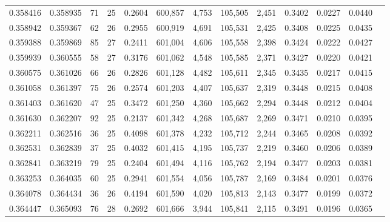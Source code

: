 \begin{tabular}{rrrrrrrrrrrrr}
0.358416 & 0.358935 &  71 &  25 &                                     0.2604 & 600,857 &   4,753 & 105,505 &   2,451 & 0.3402 & 0.0227 & 0.0440 \\
0.358942 & 0.359367 &  62 &  26 &                                     0.2955 & 600,919 &   4,691 & 105,531 &   2,425 & 0.3408 & 0.0225 & 0.0435 \\
0.359388 & 0.359869 &  85 &  27 &                                     0.2411 & 601,004 &   4,606 & 105,558 &   2,398 & 0.3424 & 0.0222 & 0.0427 \\
0.359939 & 0.360555 &  58 &  27 &                                     0.3176 & 601,062 &   4,548 & 105,585 &   2,371 & 0.3427 & 0.0220 & 0.0421 \\
0.360575 & 0.361026 &  66 &  26 &                                     0.2826 & 601,128 &   4,482 & 105,611 &   2,345 & 0.3435 & 0.0217 & 0.0415 \\
0.361058 & 0.361397 &  75 &  26 &                                     0.2574 & 601,203 &   4,407 & 105,637 &   2,319 & 0.3448 & 0.0215 & 0.0408 \\
0.361403 & 0.361620 &  47 &  25 &                                     0.3472 & 601,250 &   4,360 & 105,662 &   2,294 & 0.3448 & 0.0212 & 0.0404 \\
0.361630 & 0.362207 &  92 &  25 &                                     0.2137 & 601,342 &   4,268 & 105,687 &   2,269 & 0.3471 & 0.0210 & 0.0395 \\
0.362211 & 0.362516 &  36 &  25 &                                     0.4098 & 601,378 &   4,232 & 105,712 &   2,244 & 0.3465 & 0.0208 & 0.0392 \\
0.362531 & 0.362839 &  37 &  25 &                                     0.4032 & 601,415 &   4,195 & 105,737 &   2,219 & 0.3460 & 0.0206 & 0.0389 \\
0.362841 & 0.363219 &  79 &  25 &                                     0.2404 & 601,494 &   4,116 & 105,762 &   2,194 & 0.3477 & 0.0203 & 0.0381 \\
0.363253 & 0.364035 &  60 &  25 &                                     0.2941 & 601,554 &   4,056 & 105,787 &   2,169 & 0.3484 & 0.0201 & 0.0376 \\
0.364078 & 0.364434 &  36 &  26 &                                     0.4194 & 601,590 &   4,020 & 105,813 &   2,143 & 0.3477 & 0.0199 & 0.0372 \\
0.364447 & 0.365093 &  76 &  28 &                                     0.2692 & 601,666 &   3,944 & 105,841 &   2,115 & 0.3491 & 0.0196 & 0.0365 \\

\end{tabular}
